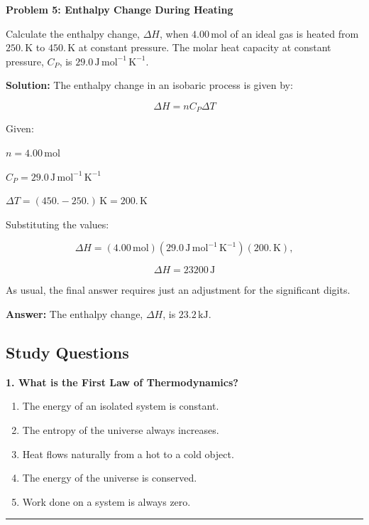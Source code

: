 \documentclass[
  9pt,
]{extbook}
\providecommand{\tightlist}{%
  \setlength{\itemsep}{0pt}\setlength{\parskip}{0pt}}
\theoremstyle{definition}
\theoremstyle{definition}
\theoremstyle{definition}
\theoremstyle{definition}
\theoremstyle{remark}
\begin{document}
\textbf{Problem 5: Enthalpy Change During Heating}

Calculate the enthalpy change, \(\Delta H\), when \(4.00 \, \text{mol}\) of an ideal gas is heated from \(250. \, \text{K}\) to \(450. \, \text{K}\) at constant pressure. The molar heat capacity at constant pressure, \(C_P\), is \(29.0 \, \text{J} \, \text{mol}^{-1} \, \text{K}^{-1}\).

\textbf{Solution:} The enthalpy change in an isobaric process is given by:

\[ \Delta H = n C_P \Delta T \]

Given:

\(n = 4.00 \, \text{mol}\)

\(C_P = 29.0 \, \text{J} \, \text{mol}^{-1} \, \text{K}^{-1}\)

\(\Delta T = (450. - 250.) \, \text{K} = 200. \, \text{K}\)

Substituting the values:

\[ \Delta H = (4.00\, \text{mol}) (29.0 \, \text{J} \, \text{mol}^{-1} \, \text{K}^{-1}) (200.\,\text{K}),\]

\[ \Delta H = 23200 \, \text{J} \]

As usual, the final answer requires just an adjustment for the significant digits.

\textbf{Answer:} The enthalpy change, \(\Delta H\), is \(23.2 \, \text{kJ}\).

\subsection{Study Questions}\label{quest3}

\textbf{1. What is the First Law of Thermodynamics?}

\begin{enumerate}
\def\labelenumi{\alph{enumi}.}
\tightlist
\item
  The energy of an isolated system is constant.
\item
  The entropy of the universe always increases.
\item
  Heat flows naturally from a hot to a cold object.
\item
  The energy of the universe is conserved.
\item
  Work done on a system is always zero.
\end{enumerate}

\begin{center}\rule{0.5\linewidth}{0.5pt}\end{center}
\end{document}
